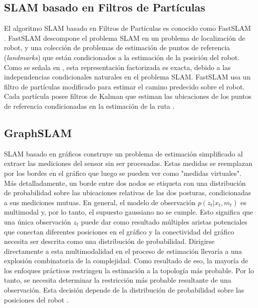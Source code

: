 \subsection{SLAM basado en Filtros de Partículas}
\label{sec:SLAM_FP}
El algoritmo SLAM basado en Filtros de Partículas es conocido como 
FastSLAM \cite{hahnel2003efficient}. FastSLAM descompone el problema SLAM en un problema de 
localizaci\'on de robot, y una colecci\'on de problemas de estimaci\'on de puntos de referencia 
(\textit{landmarks}) que est\'an condicionados a la estimaci\'on de la posici\'on del robot. Como 
se se\~nala en \cite{murphy2000bayesian}, esta representaci\'on factorizada es exacta, debido a 
las independencias condicionales naturales en el problema SLAM. FastSLAM usa un filtro de 
part\'iculas modificado para estimar el camino predecido sobre el robot. Cada part\'icula 
posee filtros de Kalman que estiman las ubicaciones de los puntos de referencia condicionadas 
en la estimaci\'on de la ruta \cite{montemerlo2007fastslam}.

\subsection{GraphSLAM}
SLAM basado en gr\'aficos construye un problema de estimaci\'on simplificado al extraer 
las mediciones del sensor sin ser procesadas. Estas medidas se reemplazan por los bordes en 
el gr\'afico que luego se pueden ver como "medidas virtuales". M\'as detalladamente, un borde 
entre dos nodos se etiqueta con una distribuci\'on de probabilidad sobre las ubicaciones 
relativas de las dos posturas, condicionadas a sus mediciones mutuas. En general, el modelo 
de observaci\'on $p(z_{t}| x_{t}, m_{t})$ es multimodal y, por lo tanto, el supuesto gaussiano 
no se cumple. Esto significa que una \'unica observaci\'on $z_{t}$ puede dar como resultado 
m\'ultiples aristas potenciales que conectan diferentes posiciones en el gr\'afico y la 
conectividad del gr\'afico necesita ser descrita como una distribuci\'on de probabilidad. Dirigirse 
directamente a esta multimodalidad en el proceso de estimaci\'on llevar\'ia a una explosi\'on 
combinatoria de la complejidad. Como resultado de eso, la mayor\'ia de los enfoques pr\'acticos 
restringen la estimaci\'on a la topolog\'ia m\'as probable. Por lo tanto, se necesita 
determinar la restricci\'on m\'as probable resultante de una observaci\'on. Esta decisi\'on 
depende de la distribuci\'on de probabilidad sobre las posiciones del robot \cite{grisetti2010tutorial}.

